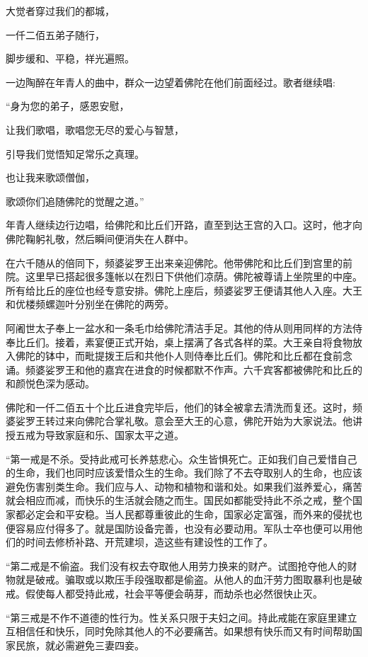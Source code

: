 \documentclass[12pt,twoside,openany]{book}
\begin{document}
大觉者穿过我们的都城，

一仟二佰五弟子随行，

脚步缓和、平稳，祥光遍照。

一边陶醉在年青人的曲中，群众一边望着佛陀在他们前面经过。歌者继续唱:

“身为您的弟子，感恩安慰，

让我们歌唱，歌唱您无尽的爱心与智慧，

引导我们觉悟知足常乐之真理。

也让我来歌颂僧伽，

歌颂你们追随佛陀的觉醒之道。”

年青人继续边行边唱，给佛陀和比丘们开路，直至到达王宫的入口。这时，他才向佛陀鞠躬礼敬，然后瞬间便消失在人群中。

在六千随从的倍同下，频婆娑罗王出来亲迎佛陀。他带佛陀和比丘们到宫里的前院。这里早已搭起很多篷帐以在烈日下供他们凉荫。佛陀被尊请上坐院里的中座。所有给比丘的座位也经专意安排。佛陀上座后，频婆娑罗王便请其他人入座。大王和优楼频螺迦叶分别坐在佛陀的两旁。

阿阇世太子奉上一盆水和一条毛巾给佛陀清洁手足。其他的侍从则用同样的方法侍奉比丘们。接着，素宴便正式开始，桌上摆满了各式各样的菜。大王亲自将食物放入佛陀的钵中，而毗提拨王后和共他仆人则侍奉比丘们。佛陀和比丘都在食前念诵。频婆娑罗王和他的嘉宾在进食的时候都默不作声。六千宾客都被佛陀和比丘的和颜悦色深为感动。

佛陀和一仟二佰五十个比丘进食完毕后，他们的钵全被拿去清洗而复还。这时，频婆娑罗王转过来向佛陀合掌礼敬。意会至大王的心意，佛陀开始为大家说法。他讲授五戒为导致家庭和乐、国家太平之道。

“第一戒是不杀。受持此戒可长养慈悲心。众生皆惧死亡。正如我们自己爱惜自己的生命，我们也同时应该爱惜众生的生命。我们除了不去夺取别人的生命，也应该避免伤害别类生命。我们应与人、动物和植物和谐和处。如果我们滋养爱心，痛苦就会相应而减，而快乐的生活就会随之而生。国民如都能受持此不杀之戒，整个国家都必定会和平安稳。当人民都尊重彼此的生命，国家必定富强，而外来的侵扰也便容易应付得多了。就是国防设备完善，也没有必要动用。军队士卒也便可以用他们的时间去修桥补路、开荒建坝，造这些有建设性的工作了。

“第二戒是不偷盗。我们没有权去夺取他人用劳力换来的财产。试图抢夺他人的财物就是破戒。骗取或以欺压手段强取都是偷盗。从他人的血汗劳力图取暴利也是破戒。假使每人都受持此戒，社会平等便会萌芽，而劫杀也必然很快止灭。

“第三戒是不作不道德的性行为。性关系只限于夫妇之间。持此戒能在家庭里建立互相信任和快乐，同时免除其他人的不必要痛苦。如果想有快乐而又有时间帮助国家民旅，就必需避免三妻四妾。
\end{document}
